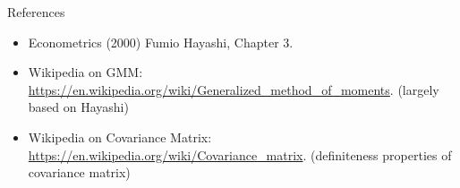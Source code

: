 \documentclass{beamer}
\begin{document}
\begin{frame}{References}
	\begin{itemize}
		\item Econometrics (2000) Fumio Hayashi, Chapter 3.
		\item Wikipedia on GMM: \url{https://en.wikipedia.org/wiki/Generalized_method_of_moments}. (largely based on Hayashi)
		\item Wikipedia on Covariance Matrix: \url{https://en.wikipedia.org/wiki/Covariance_matrix}. (definiteness properties of covariance matrix)
	\end{itemize}
\end{frame}
\end{document}

